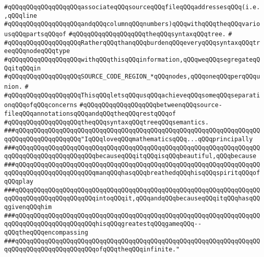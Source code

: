 \verb|#qQQqqQQqqQQqqQQqqQQqassociateqQQqsourceqQQqfileqQQqaddressesqQQq(i.e.,qQQqline|\newline
\verb|#qQQqqQQqqQQqqQQqqQQqandqQQqcolumnqQQqnumbers)qQQqwithqQQqtheqQQqvariousqQQqpartsqQQqof|\newline
\verb|#qQQqqQQqqQQqqQQqqQQqtheqQQqsyntaxqQQqtree.|\newline
\verb|#|\newline
\verb|#qQQqqQQqqQQqqQQqqQQqRatherqQQqthanqQQqburdenqQQqeveryqQQqsyntaxqQQqtreeqQQqnodeqQQqtype|\newline
\verb|#qQQqqQQqqQQqqQQqqQQqwithqQQqthisqQQqinformation,qQQqweqQQqsegregateqQQqitqQQqin|\newline
\verb|#qQQqqQQqqQQqqQQqqQQqSOURCE_CODE_REGION_*qQQqnodes,qQQqoneqQQqperqQQqunion.|\newline
\verb|#|\newline
\verb|#qQQqqQQqqQQqqQQqqQQqThisqQQqletsqQQqusqQQqachieveqQQqsomeqQQqseparationqQQqofqQQqconcerns|\newline
\verb|#qQQqqQQqqQQqqQQqqQQqbetweenqQQqsource-fileqQQqannotationsqQQqandqQQqtheqQQqrestqQQqof|\newline
\verb|#qQQqqQQqqQQqqQQqqQQqtheqQQqsyntaxqQQqtreeqQQqsemantics.|\newline
\newline
\newline
\newline
\newline
\newline
\verb|###qQQqqQQqqQQqqQQqqQQqqQQqqQQqqQQqqQQqqQQqqQQqqQQqqQQqqQQqqQQqqQQqqQQqqQQqqQQqqQQqqQQqqQQq"IqQQqloveqQQqmathematicsqQQq...qQQqprincipally|\newline
\verb|###qQQqqQQqqQQqqQQqqQQqqQQqqQQqqQQqqQQqqQQqqQQqqQQqqQQqqQQqqQQqqQQqqQQqqQQqqQQqqQQqqQQqqQQqqQQqbecauseqQQqitqQQqisqQQqbeautiful,qQQqbecause|\newline
\verb|###qQQqqQQqqQQqqQQqqQQqqQQqqQQqqQQqqQQqqQQqqQQqqQQqqQQqqQQqqQQqqQQqqQQqqQQqqQQqqQQqqQQqqQQqqQQqmanqQQqhasqQQqbreathedqQQqhisqQQqspiritqQQqofqQQqplay|\newline
\verb|###qQQqqQQqqQQqqQQqqQQqqQQqqQQqqQQqqQQqqQQqqQQqqQQqqQQqqQQqqQQqqQQqqQQqqQQqqQQqqQQqqQQqqQQqqQQqintoqQQqit,qQQqandqQQqbecauseqQQqitqQQqhasqQQqgivenqQQqhim|\newline
\verb|###qQQqqQQqqQQqqQQqqQQqqQQqqQQqqQQqqQQqqQQqqQQqqQQqqQQqqQQqqQQqqQQqqQQqqQQqqQQqqQQqqQQqqQQqqQQqhisqQQqgreatestqQQqgameqQQq--qQQqtheqQQqencompassing|\newline
\verb|###qQQqqQQqqQQqqQQqqQQqqQQqqQQqqQQqqQQqqQQqqQQqqQQqqQQqqQQqqQQqqQQqqQQqqQQqqQQqqQQqqQQqqQQqqQQqofqQQqtheqQQqinfinite."|\newline
